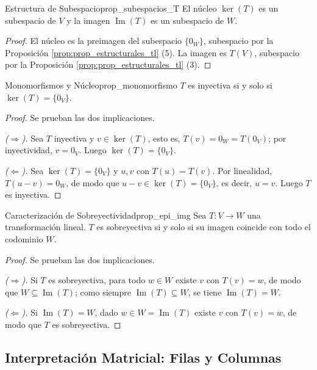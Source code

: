 \documentclass[11pt, a4paper]{article}
\begin{document}
\begin{proposicion}{Estructura de Subespacio}{prop_subespacios_T}
El núcleo $\ker(T)$ es un subespacio de $V$ y la imagen $\operatorname{Im}(T)$ es un subespacio de $W$.
\end{proposicion}

\begin{proof}
El núcleo es la preimagen del subespacio $\{0_W\}$, subespacio por la Proposición \ref{prop:prop_estructurales_tl} (5). La imagen es $T(V)$, subespacio por la Proposición \ref{prop:prop_estructurales_tl} (3).
\end{proof}

\begin{proposicion}{Monomorfismos y Núcleo}{prop_monomorfismo}
$T$ es inyectiva si y solo si $\ker(T) = \{0_V\}$.
\end{proposicion}

\begin{proof}
Se prueban las dos implicaciones.

\textit{($\Rightarrow$).} Sea $T$ inyectiva y $v \in \ker(T)$, esto es, $T(v) = 0_W = T(0_V)$; por inyectividad, $v = 0_V$. Luego $\ker(T) = \{0_V\}$.

\textit{($\Leftarrow$).} Sea $\ker(T) = \{0_V\}$ y $u, v$ con $T(u) = T(v)$. Por linealidad, $T(u - v) = 0_W$, de modo que $u - v \in \ker(T) = \{0_V\}$, es decir, $u = v$. Luego $T$ es inyectiva.
\end{proof}

\begin{proposicion}{Caracterización de Sobreyectividad}{prop_epi_img}
Sea $T: V \to W$ una transformación lineal.
$T$ es sobreyectiva si y solo si su imagen coincide con todo el codominio $W$.
\end{proposicion}

\begin{proof}
Se prueban las dos implicaciones.

\textit{($\Rightarrow$).} Si $T$ es sobreyectiva, para todo $w \in W$ existe $v$ con $T(v) = w$, de modo que $W \subseteq \operatorname{Im}(T)$; como siempre $\operatorname{Im}(T) \subseteq W$, se tiene $\operatorname{Im}(T) = W$.

\textit{($\Leftarrow$).} Si $\operatorname{Im}(T) = W$, dado $w \in W = \operatorname{Im}(T)$ existe $v$ con $T(v) = w$, de modo que $T$ es sobreyectiva.
\end{proof}

\subsection{Interpretación Matricial: Filas y Columnas}
\end{document}
